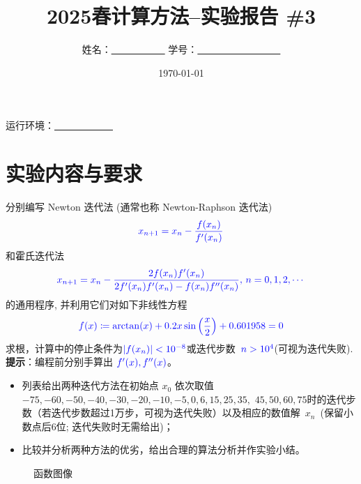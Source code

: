 \documentclass[UTF8]{ctexart}
\title{\textbf {2025春计算方法--实验报告 \#3}}
\author{姓名：\underline{~~~~~~~~~~~}  学号：\underline{~~~~~~~~~~~~~~~~~} }
\date{\today}
\begin{document}
\maketitle

运行环境：\underline{~~~~~~~~~~~~}

\section*{实验内容与要求}


分别编写 Newton 迭代法 (通常也称 Newton-Raphson 迭代法)
\[\color{blue}x_{n+1}=x_n-\frac{f(x_n)}{f'(x_n)}\]
和霍氏迭代法
 \[\color{blue} x_{n+1}= x_n - \frac{2f(x_n)f'(x_n)}{2f'(x_n)f'(x_n) - f(x_n)f''(x_n)}, \, n=0,1,2,\cdots\]
的通用程序, 并利用它们对如下非线性方程
\[\color{blue} f(x)\coloneqq{\arctan(x)}+0.2x\sin\left(\dfrac x2\right)+0.601958 =0\]
求根，计算中的停止条件为$\color{blue}|f(x_n)|<10^{-8}$或迭代步数~$\color{blue}n>10^4$(可视为迭代失败).
\textbf{提示}：编程前分别手算出$~\color{blue}f'(x), f''(x)$。

\begin{itemize}
    \item 列表给出两种迭代方法在初始点 $x_0$ 依次取值$-75, -60,-50, -40, -30, -20, -10, -5, 0, 6, 15, 25, 35,$ $ 45, 50, 60, 75$时的迭代步数（若迭代步数超过1万步，可视为迭代失败）以及相应的数值解~$x_n$~(保留小数点后6位; 迭代失败时无需给出)；
    \item 比较并分析两种方法的优劣，给出合理的算法分析并作实验小结。
\end{itemize}

\begin{figure}[H]
    \begin{center}
        \caption{函数图像}
        \label{fig:fig1}
    \end{center}
\end{figure}


\clearpage
\end{document}
